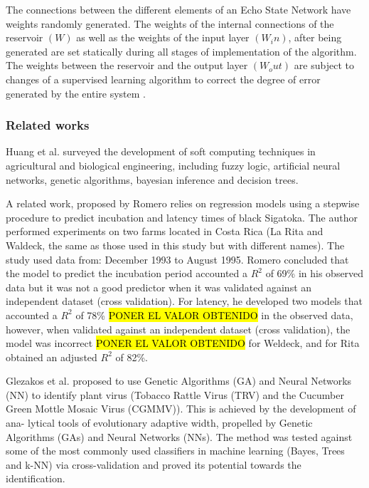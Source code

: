 \documentclass[review]{elsarticle}
\begin{document}
The connections between the different elements of an Echo State Network have weights randomly generated. The weights of the internal connections of the reservoir $(W)$ as well as the weights of the input layer $(W_in)$, after being generated are set statically during all stages of implementation of the algorithm. The weights between the reservoir and the output layer $(W_out)$ are subject to changes of a supervised learning algorithm to correct the degree of error generated by the entire system \citep{Lukose2012}.

\subsubsection{Related works}
Huang et al. \citep{Huang2010}  surveyed the development of soft computing techniques in agricultural and biological engineering, including fuzzy logic, artificial neural networks, genetic algorithms, bayesian inference and decision trees.

A related work, proposed by Romero \citep{Romero1995} relies on regression models using a stepwise procedure to predict incubation and latency times of black Sigatoka. The author performed experiments on two farms located in Costa Rica (La Rita and Waldeck, the same as those used in this study but with different names). The study used data from: December 1993 to August 1995. Romero concluded that the model to predict the incubation period accounted a $R^2$ of 69\% in his observed data but it was not a good predictor when it was validated against an independent dataset (cross validation). For latency, he developed two models that accounted a $R^2$ of 78\% \hl{PONER EL VALOR OBTENIDO} in the observed data, however, when validated against an independent dataset (cross validation), the model was incorrect \hl{PONER EL VALOR OBTENIDO} for Weldeck, and for Rita obtained an adjusted $R^2$ of 82\%. 

Glezakos et al. \citep{Glezakos2010} proposed to use Genetic Algorithms (GA) and Neural Networks (NN) to identify plant virus (Tobacco Rattle Virus (TRV) and the Cucumber Green Mottle Mosaic Virus (CGMMV)). This is achieved by the development of ana- lytical tools of evolutionary adaptive width, propelled by Genetic Algorithms (GAs) and Neural Networks (NNs). The method was tested against some of the most commonly used classifiers in machine learning (Bayes, Trees and k-NN) via cross-validation and proved its potential towards the identification. 
\end{document}
